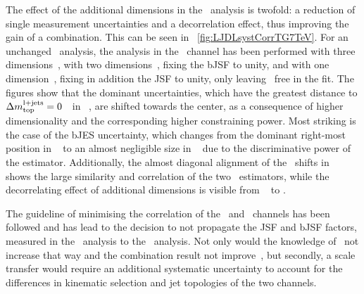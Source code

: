 %
%
The effect of the additional dimensions in the \ljets\ analysis is twofold: a reduction of single measurement uncertainties and a decorrelation effect, thus improving the gain of a combination. 
%
This can be seen in \fig~\ref{fig:LJDLsystCorrTG7TeV}. For an unchanged \dil\ analysis, the analysis in the \ljets\ channel has been performed with three dimensions~, with two dimensions~, fixing the \gls{bJSF} to unity, and with one dimension~, fixing in addition the \gls{JSF} to unity, only leaving \mt\ free in the fit. 
%
The figures show that the dominant uncertainties, which have the greatest distance to $\Delta m_{\mathrm{top}}^{\mathrm{l+jets}}=0$~\GeV\ in \fig~, are shifted towards the center, as a consequence of higher dimensionality and the corresponding higher constraining power. 
%
Most striking is the case of the \gls{bJES} uncertainty, which changes from the dominant right-most position in \fig~ to an almost negligible size in \fig~ due to the discriminative power of the \rbqr estimator. 
%
%
Additionally, the almost diagonal alignment of the \mt\ shifts in \fig~ shows the large similarity and correlation of the two \oned\ estimators, while the decorrelating effect of additional dimensions is visible from \fig~ to . 


The guideline of minimising the correlation of the \ljets\ and \dil\ channels has been followed and has lead to the decision to not propagate the \gls{JSF} and \gls{bJSF} factors, measured in the \ljets\ analysis to the \dil\ analysis. 
%
Not only would the knowledge of \mt\ not increase that way and the combination result not improve~\cite{Aaltonen2009}, but secondly, a scale transfer would require an additional systematic uncertainty to account for the differences in kinematic selection and jet topologies of the two channels. 














